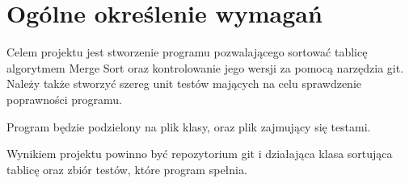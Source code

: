 	\newpage
\section{Ogólne określenie wymagań}		%

\hspace{0.60cm}

Celem projektu jest stworzenie programu pozwalającego sortować tablicę algorytmem Merge Sort oraz kontrolowanie jego wersji za pomocą narzędzia git. Należy także stworzyć szereg unit testów mających na celu sprawdzenie poprawności programu. 

Program będzie podzielony na plik klasy, oraz plik zajmujący się testami.

Wynikiem projektu powinno być repozytorium git i działająca klasa sortująca tablicę oraz zbiór testów, które program spełnia.
